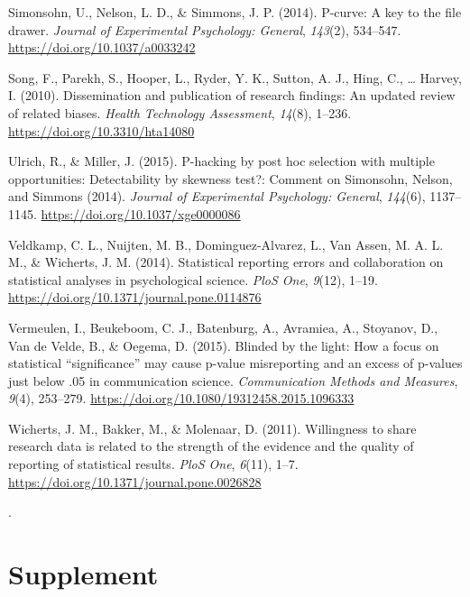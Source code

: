 \documentclass[
  12pt,
]{article}
\begin{document}
\leavevmode\hypertarget{ref-Simonsohn}{}%
Simonsohn, U., Nelson, L. D., \& Simmons, J. P. (2014). P-curve: A key
to the file drawer. \emph{Journal of Experimental Psychology: General},
\emph{143}(2), 534--547. \url{https://doi.org/10.1037/a0033242}

\leavevmode\hypertarget{ref-Song}{}%
Song, F., Parekh, S., Hooper, L., Ryder, Y. K., Sutton, A. J., Hing, C.,
\ldots{} Harvey, I. (2010). Dissemination and publication of research
findings: An updated review of related biases. \emph{Health Technology
Assessment}, \emph{14}(8), 1--236.
\url{https://doi.org/10.3310/hta14080}

\leavevmode\hypertarget{ref-Ulrich}{}%
Ulrich, R., \& Miller, J. (2015). P-hacking by post hoc selection with
multiple opportunities: Detectability by skewness test?: Comment on
Simonsohn, Nelson, and Simmons (2014). \emph{Journal of Experimental
Psychology: General}, \emph{144}(6), 1137--1145.
\url{https://doi.org/10.1037/xge0000086}

\leavevmode\hypertarget{ref-Veldkamp}{}%
Veldkamp, C. L., Nuijten, M. B., Dominguez-Alvarez, L., Van Assen, M. A.
L. M., \& Wicherts, J. M. (2014). Statistical reporting errors and
collaboration on statistical analyses in psychological science.
\emph{PloS One}, \emph{9}(12), 1--19.
\url{https://doi.org/10.1371/journal.pone.0114876}

\leavevmode\hypertarget{ref-Vermeulen}{}%
Vermeulen, I., Beukeboom, C. J., Batenburg, A., Avramiea, A., Stoyanov,
D., Van de Velde, B., \& Oegema, D. (2015). Blinded by the light: How a
focus on statistical ``significance'' may cause p-value misreporting and
an excess of p-values just below .05 in communication science.
\emph{Communication Methods and Measures}, \emph{9}(4), 253--279.
\url{https://doi.org/10.1080/19312458.2015.1096333}

\leavevmode\hypertarget{ref-Wicherts}{}%
Wicherts, J. M., Bakker, M., \& Molenaar, D. (2011). Willingness to
share research data is related to the strength of the evidence and the
quality of reporting of statistical results. \emph{PloS One},
\emph{6}(11), 1--7. \url{https://doi.org/10.1371/journal.pone.0026828}

.

\endgroup

\newpage

\setcounter{table}{0}  \renewcommand{\thetable}{S\arabic{table}} \setcounter{figure}{0} \renewcommand{\thefigure}{S\arabic{figure}}

\hypertarget{supplement}{%
\section{Supplement}\label{supplement}}
\end{document}
